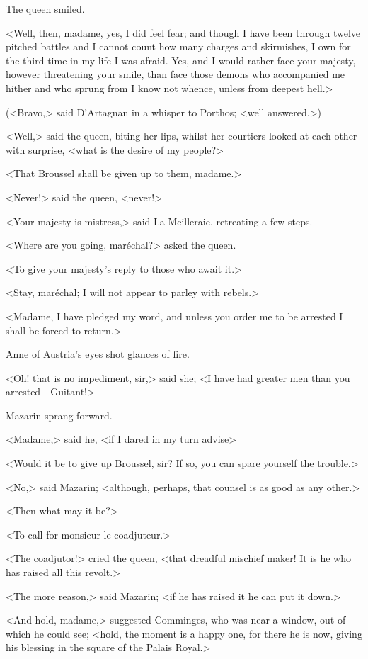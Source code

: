 The queen smiled.

<Well, then, madame, yes, I did feel fear; and though I have been through twelve pitched battles and I cannot count how many charges and skirmishes, I own for the third time in my life I was afraid. Yes, and I would rather face your majesty, however threatening your smile, than face those demons who accompanied me hither and who sprung from I know not whence, unless from deepest hell.>

(<Bravo,> said D'Artagnan in a whisper to Porthos; <well answered.>)

<Well,> said the queen, biting her lips, whilst her courtiers looked at each other with surprise, <what is the desire of my people?>

<That Broussel shall be given up to them, madame.>

<Never!> said the queen, <never!>

<Your majesty is mistress,> said La Meilleraie, retreating a few steps.

<Where are you going, maréchal?> asked the queen.

<To give your majesty's reply to those who await it.>

<Stay, maréchal; I will not appear to parley with rebels.>

<Madame, I have pledged my word, and unless you order me to be arrested I shall be forced to return.>

Anne of Austria's eyes shot glances of fire.

<Oh! that is no impediment, sir,> said she; <I have had greater men than you arrested—Guitant!>

Mazarin sprang forward.

<Madame,> said he, <if I dared in my turn advise\longdash>

<Would it be to give up Broussel, sir? If so, you can spare yourself the trouble.>

<No,> said Mazarin; <although, perhaps, that counsel is as good as any other.>

<Then what may it be?>

<To call for monsieur le coadjuteur.>

<The coadjutor!> cried the queen, <that dreadful mischief maker! It is he who has raised all this revolt.>

<The more reason,> said Mazarin; <if he has raised it he can put it down.>

<And hold, madame,> suggested Comminges, who was near a window, out of which he could see; <hold, the moment is a happy one, for there he is now, giving his blessing in the square of the Palais Royal.>

